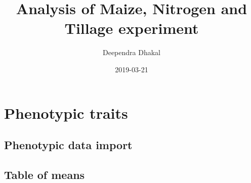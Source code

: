 \documentclass[]{article}
\title{Analysis of Maize, Nitrogen and Tillage experiment}
\author{Deependra Dhakal}
\date{2019-03-21}
\begin{document}
\maketitle

{
\setcounter{tocdepth}{3}
\tableofcontents
}
\section{Phenotypic traits}\label{phenotypic-traits}

\subsection{Phenotypic data import}\label{phenotypic-data-import}

\subsection{Table of means}\label{table-of-means}

\begingroup\fontsize{12}{14}\selectfont
\end{document}
